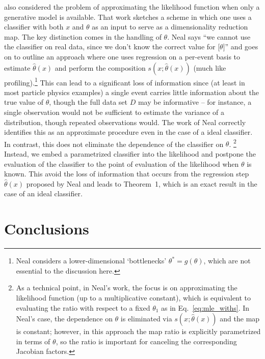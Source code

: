 \documentclass[aoas,preprint]{imsart}
\numberwithin{equation}{section}
\theoremstyle{plain}
\begin{document}
\cite{Neal:2007zz} also considered the problem of approximating the likelihood function when only a generative model is available. That work sketches a scheme in which one uses a classifier with both $x$ and $\theta$ as an input to serve as a dimensionality reduction map. 
The key distinction comes in the handling of $\theta$.  Neal says  ``we cannot use the classifier on real data, since we don't know the correct value for [$\theta]$'' and goes on to outline an approach where one uses regression on a per-event basis to estimate $\hat{\theta}(x)$ and perform the composition $s(x; \hat{\theta}(x))$ (much like profiling).\footnote{Neal considers a lower-dimensional `bottlenecks' $\theta^*=g(\theta)$, which are not essential to the discussion here.}  This can lead to a significant loss of information since (at least in most particle physics examples) a single event carries little information about the true value of $\theta$, though the full data set $D$ may be informative -- for instance, a single observation would not be sufficient to estimate the variance of a distribution, though repeated observations would.  The work of Neal correctly identifies this as an approximate procedure even in the case of a ideal classifier. In contrast, this does not eliminate the dependence of the classifier on $\theta$.%
\footnote{As a technical point, in Neal's work, the focus is on approximating the likelihood function (up to a multiplicative constant), which is equivalent to evaluating the ratio  with respect to a fixed $\theta_1$ as in Eq.~\ref{eq:mle_withs}. In Neal's case, the dependence on $\theta$ is eliminated via $s(x; \hat{\theta}(x))$ and the map is constant; however, in this approach the map ratio is explicitly parametrized in terms of $\theta$, so the ratio is important for canceling the corresponding Jacobian factors.} Instead, we embed a parametrized classifier into the likelihood and postpone the evaluation of the classifier to the point of evaluation of the likelihood when $\theta$ is known. This avoid the loss of information that occurs from the regression step $\hat{\theta}(x)$ proposed by Neal and leads to Theorem~1, which is an exact result in the case of an ideal classifier. 


\section{Conclusions}
\end{document}
